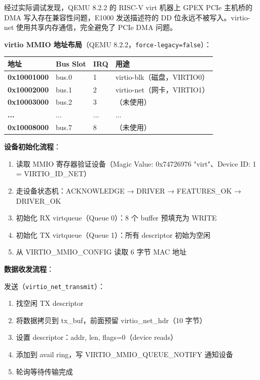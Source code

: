 \documentclass[12pt,a4paper]{ctexart}
\begin{document}
经过实际调试发现，QEMU 8.2.2 的 RISC-V virt 机器上 GPEX PCIe 主机桥的 DMA 写入存在兼容性问题，E1000 发送描述符的 DD 位永远不被写入。virtio-net 使用共享内存通信，完全避免了 PCIe DMA 问题。

\textbf{virtio MMIO 地址布局}（QEMU 8.2.2，\texttt{force-legacy=false}）：

\begin{table}[H]
\centering
\begin{tabular}{>{\bfseries}p{3cm}p{2cm}p{2cm}p{5cm}}
\toprule
\textbf{地址} & \textbf{Bus Slot} & \textbf{IRQ} & \textbf{用途} \\
\midrule
0x10001000 & bus.0 & 1 & virtio-blk（磁盘，VIRTIO0） \\
0x10002000 & bus.1 & 2 & virtio-net（网卡，VIRTIO1） \\
0x10003000 & bus.2 & 3 & （未使用） \\
... & ... & ... & ... \\
0x10008000 & bus.7 & 8 & （未使用） \\
\bottomrule
\end{tabular}
\end{table}

\textbf{设备初始化流程}：
\begin{enumerate}
  \item 读取 MMIO 寄存器验证设备（Magic Value: 0x74726976 "virt"、Device ID: 1 = VIRTIO\_ID\_NET）
  \item 走设备状态机：ACKNOWLEDGE → DRIVER → FEATURES\_OK → DRIVER\_OK
  \item 初始化 RX virtqueue（Queue 0）：8 个 buffer 预填充为 WRITE
  \item 初始化 TX virtqueue（Queue 1）：所有 descriptor 初始为空闲
  \item 从 VIRTIO\_MMIO\_CONFIG 读取 6 字节 MAC 地址
\end{enumerate}

\textbf{数据收发流程}：

发送（\texttt{virtio\_net\_transmit}）：
\begin{enumerate}
  \item 找空闲 TX descriptor
  \item 将数据拷贝到 tx\_buf，前面预留 virtio\_net\_hdr（10 字节）
  \item 设置 descriptor：addr, len, flags=0（device reads）
  \item 添加到 avail ring，写 VIRTIO\_MMIO\_QUEUE\_NOTIFY 通知设备
  \item 轮询等待传输完成
\end{enumerate}
\end{document}
